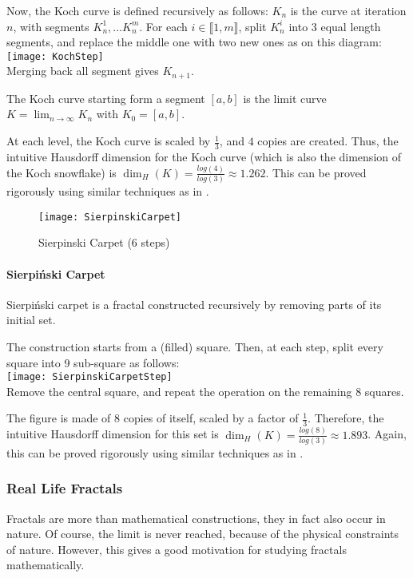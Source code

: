 Now, the Koch curve is defined recursively as follows:
$K_n$ is the curve at iteration $n$, with segments $K_n^1, \dots K_n^m$.
For each $i \in \llbracket 1,m \rrbracket$, split $K_n^i$ into 3 equal length segments, and replace the middle one with two new ones as on this diagram:\vspace{0.2cm}\\
\texttt{[image: KochStep]}\vspace{0.2cm}\\
Merging back all segment gives $K_{n+1}$.

The Koch curve starting form a segment $[a,b]$ is the limit curve $K = \lim_{n \to \infty} K_n$ with $K_0 = [a,b]$.

At each level, the Koch curve is scaled by $\frac{1}{3}$, and $4$ copies are created.
Thus, the intuitive Hausdorff dimension for the Koch curve (which is also the dimension of the Koch snowflake) is $\dim_H(K) = \frac{log(4)}{log(3)} \approx 1.262$.
This can be proved rigorously using similar techniques as in \cite[p. 34-35, ex. 2.7]{Falconer_1990}.

\begin{wrapfigure}{r}{5cm}
	\vspace{-0.5cm}
	\texttt{[image: SierpinskiCarpet]}
	\centering
	\captionsetup{justification=centering}
	\caption{Sierpinski Carpet (6 steps)}
	\label{fig:SierpinskiCarpet}
	\vspace{-3cm}
\end{wrapfigure}
\paragraph{Sierpiński Carpet}
Sierpiński carpet is a fractal constructed recursively by removing parts of its initial set.

The construction starts from a (filled) square.
Then, at each step, split every square into 9 sub-square as follows:\\
\texttt{[image: SierpinskiCarpetStep]}\\
Remove the central square, and repeat the operation on the remaining 8 squares.

The figure is made of $8$ copies of itself, scaled by a factor of $\frac{1}{3}$.
Therefore, the intuitive Hausdorff dimension for this set is $\dim_H(K) = \frac{log(8)}{log(3)} \approx 1.893$.
Again, this can be proved rigorously using similar techniques as in \cite[p. 34-35, ex. 2.7]{Falconer_1990}.


\subsubsection{Real Life Fractals}
Fractals are more than mathematical constructions, they in fact also occur in nature.
Of course, the limit is never reached, because of the physical constraints of nature.
However, this gives a good motivation for studying fractals mathematically.

